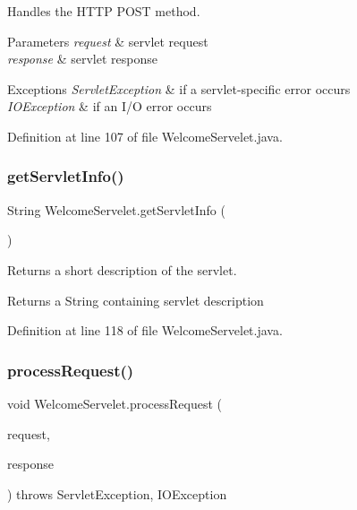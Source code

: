 Handles the H\+T\+TP {\ttfamily P\+O\+ST} method.


\begin{DoxyParams}{Parameters}
{\em request} & servlet request \\
\hline
{\em response} & servlet response \\
\hline
\end{DoxyParams}

\begin{DoxyExceptions}{Exceptions}
{\em Servlet\+Exception} & if a servlet-\/specific error occurs \\
\hline
{\em I\+O\+Exception} & if an I/O error occurs \\
\hline
\end{DoxyExceptions}


Definition at line 107 of file Welcome\+Servelet.\+java.

\mbox{\label{class_welcome_servelet_a9905a77fc2509601c0cab030c0230e84}} 
\subsubsection{\texorpdfstring{getServletInfo()}{getServletInfo()}}
{\footnotesize\ttfamily String Welcome\+Servelet.\+get\+Servlet\+Info (\begin{DoxyParamCaption}{ }\end{DoxyParamCaption})}

Returns a short description of the servlet.

\begin{DoxyReturn}{Returns}
a String containing servlet description 
\end{DoxyReturn}


Definition at line 118 of file Welcome\+Servelet.\+java.

\mbox{\label{class_welcome_servelet_afde59590274b4c3f95446e9f08fea5ef}} 
\subsubsection{\texorpdfstring{processRequest()}{processRequest()}}
{\footnotesize\ttfamily void Welcome\+Servelet.\+process\+Request (\begin{DoxyParamCaption}\item[{Http\+Servlet\+Request}]{request,  }\item[{Http\+Servlet\+Response}]{response }\end{DoxyParamCaption}) throws Servlet\+Exception, I\+O\+Exception\hspace{0.3cm}{\ttfamily [protected]}}

